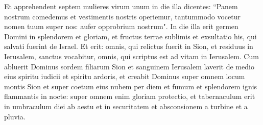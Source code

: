 \begin{biblechapter}  
\verse Et apprehendent septem mulieres virum unum in die illa dicentes: “Panem nostrum comedemus et vestimentis nostris operiemur, tantummodo vocetur nomen tuum super nos: aufer opprobrium nostrum". 
\verse In die illa erit germen Domini in splendorem et gloriam, et fructus terrae sublimis et exsultatio his, qui salvati fuerint de Israel. 
\verse Et erit: omnis, qui relictus fuerit in Sion, et residuus in Ierusalem, sanctus vocabitur, omnis, qui scriptus est ad vitam in Ierusalem. 
\verse Cum abluerit Dominus sordem filiarum Sion et sanguinem Ierusalem laverit de medio eius spiritu iudicii et spiritu ardoris, 
\verse et creabit Dominus super omnem locum montis Sion et super coetum eius nubem per diem et fumum et splendorem ignis flammantis in nocte: super omnem enim gloriam protectio, 
\verse et tabernaculum erit in umbraculum diei ab aestu et in securitatem et absconsionem a turbine et a pluvia. 
\end{biblechapter}

